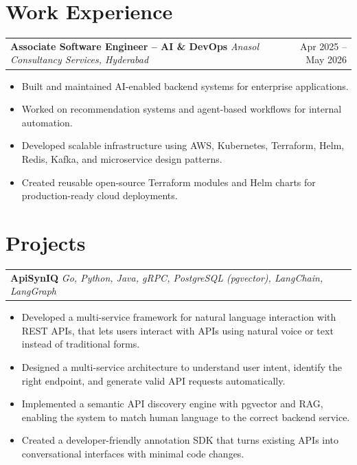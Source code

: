 \documentclass[a4paper,11pt]{article}
\makeatletter
\newcommand{\GitHubIcon}{\faGithub}
\newcommand{\GitHubIcon}{\textbf{GH}}
\newcommand{\cventry}[5][]{%
  \begin{samepage}
  \begin{tabularx}{\linewidth}{@{}X r@{}}
    \textbf{#2} \textit{\small\color{lightgray}#3} & \small\color{lightgray}#4 \ifthenelse{\equal{#1}{}}{}{\hspace{0.3em}\textcolor{accent}{#1}} \\
  \end{tabularx}%
  \vspace{1pt}
  \begin{itemize}[nosep, leftmargin=1.2em, itemsep=2pt, topsep=1pt, label={\small\textbullet}]
    #5
  \end{itemize}
  \vspace{4pt}
  \end{samepage}
}
\makeatother
\begin{document}
\section{Work Experience}

\cventry{Associate Software Engineer -- AI \& DevOps}{Anasol Consultancy Services, Hyderabad}{Apr 2025 -- May 2026}{
  \item Built and maintained AI-enabled backend systems for enterprise applications.
  \item Worked on recommendation systems and agent-based workflows for internal automation.
  \item Developed scalable infrastructure using AWS, Kubernetes, Terraform, Helm, Redis, Kafka, and microservice design patterns.
  \item Created reusable open-source Terraform modules and Helm charts for production-ready cloud deployments.
}



\section{Projects}
\vspace{4pt}

\cventry[\href{https://github.com/KoteshwarChinnolla/ApiSynIQ}{\GitHubIcon}]{ApiSynIQ}{\normalfont\small Go, Python, Java, gRPC, PostgreSQL (pgvector), LangChain, LangGraph}{}{\item Developed a multi-service framework for natural language interaction with REST APIs, that lets users interact with APIs using natural voice or text instead of traditional forms.
  \item Designed a multi-service architecture to understand user intent, identify the right endpoint, and generate valid API requests automatically.
  \item Implemented a semantic API discovery engine with pgvector and RAG, enabling the system to match human language to the correct backend service.
  \item Created a developer-friendly annotation SDK that turns existing APIs into conversational interfaces with minimal code changes.
}
\end{document}
